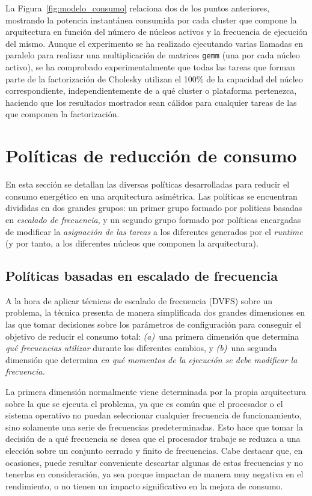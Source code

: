 La Figura~\ref{fig:modelo_consumo} relaciona dos de los puntos anteriores,
mostrando la potencia instantánea consumida por cada cluster que compone la
arquitectura en función del número de núcleos activos y la frecuencia de
ejecución del mismo. Aunque el experimento se ha realizado ejecutando
varias llamadas en paralelo para realizar una multiplicación de matrices
\texttt{gemm} (una por cada núcleo activo), se ha comprobado
experimentalmente que todas las tareas que forman parte de la factorización
de Cholesky utilizan el 100\% de la capacidad del núcleo correspondiente,
independientemente de a qué cluster o plataforma pertenezca, haciendo que
los resultados mostrados sean cálidos para cualquier tareas de las que
componen la factorización.  









\section{Políticas de reducción de consumo}
En esta sección se detallan las diversas políticas desarrolladas para
reducir el consumo energético en una arquitectura asimétrica. Las políticas
se encuentran divididas en dos grandes grupos: un primer grupo formado por
politicas basadas en {\em escalado de frecuencia}, y un segundo grupo
formado por políticas encargadas de modificar la {\em asignación de las
  tareas} a los diferentes \wts generados por el \emph{runtime} (y por
tanto, a los diferentes núcleos que componen la arquitectura).

\subsection[{Políticas basadas en escalado de frecuencia (P1, P2, P2' y P3)}]{Políticas basadas en escalado de frecuencia}

A la hora de aplicar técnicas de escalado de frecuencia (DVFS) sobre un
problema, la técnica presenta de manera simplificada dos grandes
dimensiones en las que tomar decisiones sobre los parámetros de
configuración para conseguir el objetivo de reducir el consumo total: {\em
  (a)}~una primera dimensión que determina {\em qué frecuencias utilizar}
durante los diferentes cambios, y {\em (b)}~una segunda dimensión que
determina \emph{en qué momentos de la ejecución se debe modificar la
  frecuencia.}

La primera dimensión normalmente viene determinada por la propia
arquitectura sobre la que se ejecuta el problema, ya que es común que el
procesador o el sistema operativo no puedan seleccionar cualquier
frecuencia de funcionamiento, sino solamente una serie de frecuencias
predeterminadas. Esto hace que tomar la decisión de a qué frecuencia se
desea que el procesador trabaje se reduzca a una elección sobre un conjunto
cerrado y finito de frecuencias. Cabe destacar que, en ocasiones, puede
resultar conveniente descartar algunas de estas frecuencias y no tenerlas
en consideración, ya sea porque impactan de manera muy negativa en el
rendimiento, o no tienen un impacto significativo en la mejora de
consumo.

